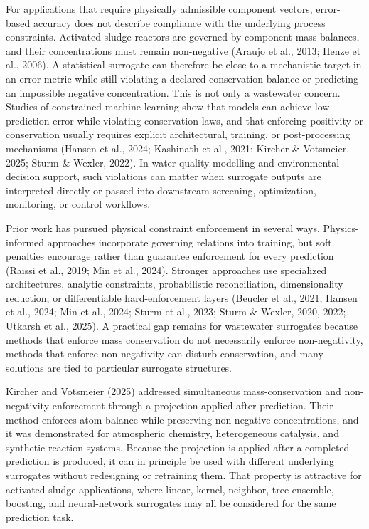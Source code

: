 \documentclass[a4paper,fleqn]{cas-sc}
\begin{document}
For applications that require physically admissible component vectors, error-based accuracy does not describe compliance with the underlying process constraints. Activated sludge reactors are governed by component mass balances, and their concentrations must remain non-negative (Araujo et al., 2013; Henze et al., 2006). A statistical surrogate can therefore be close to a mechanistic target in an error metric while still violating a declared conservation balance or predicting an impossible negative concentration. This is not only a wastewater concern. Studies of constrained machine learning show that models can achieve low prediction error while violating conservation laws, and that enforcing positivity or conservation usually requires explicit architectural, training, or post-processing mechanisms (Hansen et al., 2024; Kashinath et al., 2021; Kircher \& Votsmeier, 2025; Sturm \& Wexler, 2022). In water quality modelling and environmental decision support, such violations can matter when surrogate outputs are interpreted directly or passed into downstream screening, optimization, monitoring, or control workflows.

Prior work has pursued physical constraint enforcement in several ways. Physics-informed approaches incorporate governing relations into training, but soft penalties encourage rather than guarantee enforcement for every prediction (Raissi et al., 2019; Min et al., 2024). Stronger approaches use specialized architectures, analytic constraints, probabilistic reconciliation, dimensionality reduction, or differentiable hard-enforcement layers (Beucler et al., 2021; Hansen et al., 2024; Min et al., 2024; Sturm et al., 2023; Sturm \& Wexler, 2020, 2022; Utkarsh et al., 2025). A practical gap remains for wastewater surrogates because methods that enforce mass conservation do not necessarily enforce non-negativity, methods that enforce non-negativity can disturb conservation, and many solutions are tied to particular surrogate structures.

Kircher and Votsmeier (2025) addressed simultaneous mass-conservation and non-negativity enforcement through a projection applied after prediction. Their method enforces atom balance while preserving non-negative concentrations, and it was demonstrated for atmospheric chemistry, heterogeneous catalysis, and synthetic reaction systems. Because the projection is applied after a completed prediction is produced, it can in principle be used with different underlying surrogates without redesigning or retraining them. That property is attractive for activated sludge applications, where linear, kernel, neighbor, tree-ensemble, boosting, and neural-network surrogates may all be considered for the same prediction task.
\end{document}

